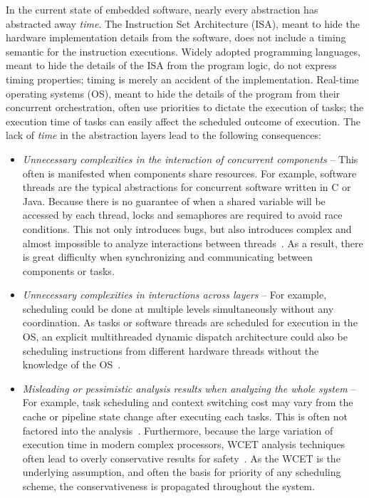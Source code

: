 In the current state of embedded software, nearly every abstraction has abstracted away \emph{time}.
The Instruction Set Architecture (ISA), meant to hide the hardware implementation details from the software, does not include a timing semantic for the instruction executions.  
Widely adopted programming languages, meant to hide the details of the ISA from the program logic, do not express timing properties; timing is merely an accident of the implementation.
Real-time operating systems (OS), meant to hide the details of the program from their concurrent orchestration, often use priorities to dictate the execution of tasks; the execution time of tasks can easily affect the scheduled outcome of execution.
The lack of \emph{time} in the abstraction layers lead to the following consequences:
\begin{itemize}
\item \emph{Unnecessary complexities in the interaction of concurrent components} --  
This often is manifested when components share resources. 
For example, software threads are the typical abstractions for concurrent software written in C or Java. 
Because there is no guarantee of when a shared variable will be accessed by each thread, locks and semaphores are required to avoid race conditions. 
This not only introduces bugs, but also introduces complex and almost impossible to analyze interactions between threads~\cite{Lee2006threads}. 
As a result, there is great difficulty when synchronizing and communicating between components or tasks.

\item \emph{Unnecessary complexities in interactions across layers} -- 
For example, scheduling could be done at multiple levels simultaneously without any coordination. 
As tasks or software threads are scheduled for execution in the OS, an explicit multithreaded dynamic dispatch architecture could also be scheduling instructions from different hardware threads without the knowledge of the OS~\cite{thiele_et_al:DSP:2004:2}.

\item \emph{Misleading or pessimistic analysis results when analyzing the whole system} -- 
For example, task scheduling and context switching cost may vary from the cache or pipeline state change after executing each tasks. 
This is often not factored into the analysis~\cite{thiele_et_al:DSP:2004:2}. 
Furthermore, because the  large variation of execution time in modern complex processors, WCET analysis techniques often lead to overly conservative results for safety~\cite{Wilhelm2008survey}. 
As the WCET is the underlying  assumption, and often the basis for priority of any scheduling scheme, the conservativeness is propagated throughout the system.
\end{itemize}

